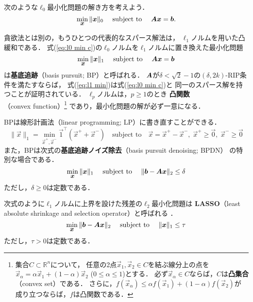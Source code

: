 



次のような$\ell_0$最小化問題の解き方を考えよう．
\begin{equation}
 \min_{\small\mbox{\boldmath $x$}} \|\mbox{\boldmath $x$}\|_0\quad\mbox{ subject to }\quad \mbox{\boldmath $A$}\mbox{\boldmath $x$}=\mbox{\boldmath $b$}.
\label{eq:l0 min c}
\end{equation}


貪欲法とは別の，もうひとつの代表的なスパース解法は，
$\ell_1$ノルムを用いた凸緩和である．
式(\ref{eq:l0 min c})の$\ell_0$ノルムを$\ell_1$ノルムに置き換えた最小化問題
\begin{equation}
 \min_{\small\mbox{\boldmath $x$}} \|\mbox{\boldmath $x$}\|_1\quad\mbox{ subject to }\quad \mbox{\boldmath $A$}\mbox{\boldmath $x$}=\mbox{\boldmath $b$}
\label{eq:l1 min}
\end{equation}
は{\bf 基底追跡}（basis pursuit; BP）と呼ばれる\cite{Chen98}．
$\mbox{\boldmath $A$}$が$\delta<\sqrt{2}-1$の$(\delta,2k)$-RIP条件を満たすならば，
式(\ref{eq:l1 min})は式(\ref{eq:l0 min c})と
同一のスパース解を持つことが証明されている\cite{Candes06b,Candes08RIP}．
$\ell_p$ノルムは，$p\geq 1$のとき%
{\bf 凸関数}（convex function）\footnote{%
集合$C\subset\mathbb{R}^n$について，
任意の2点$\vec x_1,\vec x_2\in C$を結ぶ線分上の点を
$\vec x_\alpha=\alpha\vec x_1+(1-\alpha)\vec x_2$ ($0\leq\alpha\leq1$)とする．
必ず$\vec x_\alpha\in C$ならば，$C$は{\bf 凸集合}（convex set）である．
さらに，$f(\vec x_\alpha)\leq \alpha f(\vec x_1)+(1-\alpha)f(\vec x_2)$が
成り立つならば，$f$は凸関数である．}
であり，最小化問題の解が必ず一意になる．

BPは線形計画法（linear programming; LP）に書き直すことができる．
\[
 \|\vec x\|_1=\min_{\vec x^+,\vec x^-}\vec 1^\top(\vec x^++\vec x^-)
\quad\mbox{subject to}\quad
\vec x=\vec x^+-\vec x^-,\;\vec x^+\geq \vec 0,\;\vec x^-\geq\vec 0
\]
また，BPは次式の{\bf 基底追跡ノイズ除去}（basis pursuit denoising; BPDN）
\cite{Chen98}の特別な場合である．
\begin{equation}
 \min_{\small\mbox{\boldmath $x$}} \|\mbox{\boldmath $x$}\|_1\quad\mbox{ subject to }\quad \|\mbox{\boldmath $b$}-\mbox{\boldmath $A$}\mbox{\boldmath $x$}\|_2\leq\delta
\label{eq:BPDN}
\end{equation}
ただし，$\delta\geq 0$は定数である．

次式のように$\ell_1$ノルムに上界を設けた残差の$\ell_2$最小化問題は
{\bf LASSO}（least absolute shrinkage and selection operator）と呼ばれる
\cite{Tibshirani96}．
\begin{equation}
 \min_{\small\mbox{\boldmath $x$}} \|\mbox{\boldmath $b$}-\mbox{\boldmath $A$}\mbox{\boldmath $x$}\|_2
\quad\mbox{ subject to }\quad  \|\mbox{\boldmath $x$}\|_1\leq \tau
\label{eq:lasso}
\end{equation}
ただし，$\tau>0$は定数である．

